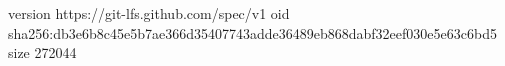 version https://git-lfs.github.com/spec/v1
oid sha256:db3e6b8c45e5b7ae366d35407743adde36489eb868dabf32eef030e5e63c6bd5
size 272044
